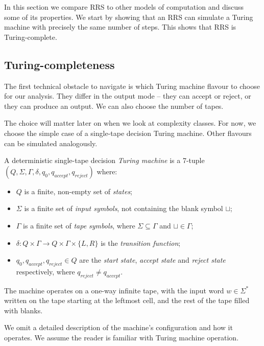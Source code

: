 \documentclass[11pt]{article}
\begin{document}
In this section we compare RRS to other models of computation and discuss some of its
properties. We start by showing that an RRS can simulate a Turing machine with
precisely the same number of steps. This shows that RRS is Turing-complete.

\subsection{Turing-completeness}

The first technical obstacle to navigate is which Turing machine flavour to choose
for our analysis. They differ in the output mode -- they can accept or reject, or they
can produce an output. We can also choose the number of tapes.

The choice will matter later on when we look at complexity classes. For now, we choose
the simple case of a single-tape decision Turing machine. Other flavours can be
simulated analogously.

\begin{definition} A deterministic
single-tape decision \emph{Turing machine} is a 7-tuple
$(Q, \Sigma, \Gamma, \delta, q_0, q_{accept}, q_{reject})$
where:
\begin{itemize}
  \item $Q$ is a finite, non-empty set of \emph{states};
  \item $\Sigma$ is a finite set of \emph{input symbols}, not containing the blank symbol
  $\sqcup$;
  \item $\Gamma$ is a finite set of \emph{tape symbols}, where $\Sigma \subseteq \Gamma$
  and $\sqcup \in \Gamma$;
  \item $\delta \colon Q \times \Gamma \to Q \times \Gamma \times \{L, R\}$ is the
  \emph{transition function};
  \item $q_0, q_{accept}, q_{reject} \in Q$ are the \emph{start state},
  \emph{accept state} and \emph{reject state} respectively, where $q_{reject} \neq q_{accept}$.
\end{itemize}
The machine operates on a one-way infinite tape, with the input word $w \in \Sigma^*$
written on the tape starting at the leftmost cell, and the rest of the tape filled with
blanks.

We omit a detailed description of the machine's configuration and how it operates.
We assume the reader is familiar with Turing machine operation.
\end{definition}
\end{document}
